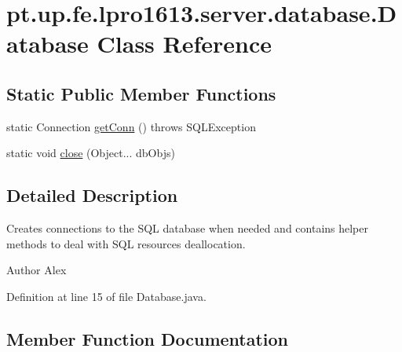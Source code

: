 \hypertarget{classpt_1_1up_1_1fe_1_1lpro1613_1_1server_1_1database_1_1_database}{}\section{pt.\+up.\+fe.\+lpro1613.\+server.\+database.\+Database Class Reference}
\label{classpt_1_1up_1_1fe_1_1lpro1613_1_1server_1_1database_1_1_database}
\subsection*{Static Public Member Functions}
\begin{DoxyCompactItemize}
\item 
static Connection \hyperlink{classpt_1_1up_1_1fe_1_1lpro1613_1_1server_1_1database_1_1_database_aa5ecc24c87d16ca20cc645414d8f3232}{get\+Conn} ()  throws S\+Q\+L\+Exception 
\item 
static void \hyperlink{classpt_1_1up_1_1fe_1_1lpro1613_1_1server_1_1database_1_1_database_ae7e6a39f412e24bea44477224f0fdef0}{close} (Object... db\+Objs)
\end{DoxyCompactItemize}


\subsection{Detailed Description}
Creates connections to the S\+QL database when needed and contains helper methods to deal with S\+QL resources deallocation. \begin{DoxyAuthor}{Author}
Alex 
\end{DoxyAuthor}


Definition at line 15 of file Database.\+java.



\subsection{Member Function Documentation}
\hypertarget{classpt_1_1up_1_1fe_1_1lpro1613_1_1server_1_1database_1_1_database_ae7e6a39f412e24bea44477224f0fdef0}{}\label{classpt_1_1up_1_1fe_1_1lpro1613_1_1server_1_1database_1_1_database_ae7e6a39f412e24bea44477224f0fdef0} 
